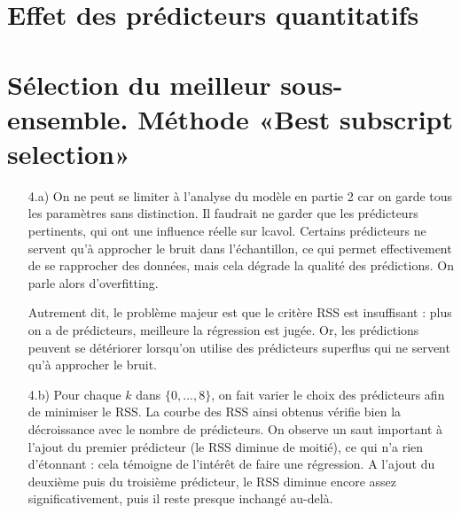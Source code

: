 \documentclass[a4paper, 12pt]{article}
\begin{document}
\section{Effet des prédicteurs quantitatifs}



\section{Sélection du meilleur sous-ensemble. Méthode «Best subscript selection»}

\begin{enumerate}
\setlength{\itemsep}{12pt}

\item[4.a)] On ne peut se limiter à l'analyse du modèle en partie 2 car on garde tous les paramètres sans distinction. Il faudrait ne garder que les prédicteurs pertinents, qui ont une influence réelle sur lcavol. Certains prédicteurs ne servent qu'à approcher le bruit dans l'échantillon, ce qui permet effectivement de se rapprocher des données, mais cela dégrade la qualité des prédictions. On parle alors d'overfitting.

Autrement dit, le problème majeur est que le critère RSS est insuffisant : plus on a de prédicteurs, meilleure la régression est jugée. Or, les prédictions peuvent se détériorer lorsqu'on utilise des prédicteurs superflus qui ne servent qu'à approcher le bruit.

\item[4.b)] Pour chaque $k$ dans $\{0, ..., 8\}$, on fait varier le choix des prédicteurs afin de minimiser le RSS. La courbe des RSS ainsi obtenus vérifie bien la décroissance avec le nombre de prédicteurs. On observe un saut important à l'ajout du premier prédicteur (le RSS diminue de moitié), ce qui n'a rien d'étonnant : cela témoigne de l'intérêt de faire une régression. A l'ajout du deuxième puis du troisième prédicteur, le RSS diminue encore assez significativement, puis il reste presque inchangé au-delà.


\end{enumerate}
\end{document}
